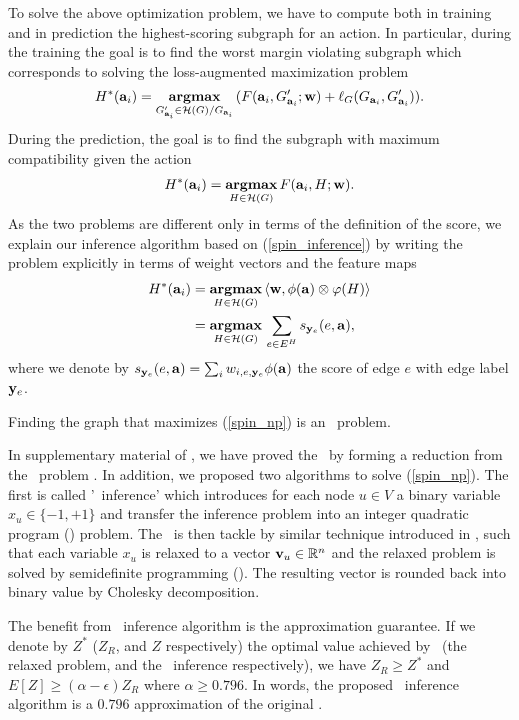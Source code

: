 {%
To solve the above optimization problem, we have to compute both in training and in prediction the highest-scoring subgraph for an action. 
In particular, during the training the goal is to find the worst margin violating subgraph which corresponds to solving the loss-augmented maximization problem
\begin{align*}
	H^*(\mathbf {a}_i) = \underset{G_{\mathbf {a}_i}'\in\mathcal{H}(G)/G_{\mathbf {a}_i}}{\textbf{argmax}}\, (F(\mathbf {a}_i,G_{\mathbf {a}_i}';\mathbf {w})+\mathbf {\ell}_{G}(G_{\mathbf {a}_i},G_{\mathbf {a}_i}')).
\end{align*}
During the prediction, the goal is to find the subgraph with maximum compatibility given the action
\begin{align}
	H^*(\mathbf {a}_i) = \underset{H\in\mathcal{H}(G)}{\textbf{argmax}}\, F(\mathbf {a}_i,H;\mathbf {w}) \label{spin_inference}.
\end{align}
As the two problems are different only in terms of the definition of the score, we explain our inference algorithm based on (\ref{spin_inference}) by writing the problem explicitly in terms of weight vectors and the feature maps
\begin{align}
	H^*(\mathbf {a}_i) &= \underset{H\in\mathcal{H}(G)}{\textbf{argmax}}\, \langle \mathbf {w}, \phi(\mathbf {a})\otimes\varphi(H) \rangle \nonumber \\
	&= \underset{H\in\mathcal{H}(G)}{\textbf{argmax}}\, \sum_{e\in E^H}s_{\mathbf {y}_e}(e,\mathbf {a}), \label{spin_np}
\end{align}
where we denote by $s_{\mathbf {y}_e}(e,\mathbf {a}) = \sum_{i}w_{i,e,\mathbf {y}_e}\phi(\mathbf {a})$ the score of edge $e$ with edge label $\mathbf {y}_e$.

\begin{lemma}
	Finding the graph that maximizes (\ref{spin_np}) is an \nphard\ problem.
\end{lemma}
In supplementary material of , we have proved the \nphardness\ by forming a reduction from the \maxcut\ problem \citep{Garey90computers}.
In addition, we proposed two algorithms to solve (\ref{spin_np}).
The first is called '{\sdp\ inference}' which introduces for each node $u\in V$ a binary variable $x_u\in\{-1,+1\}$ and transfer the inference problem into an integer quadratic program (\iqp) problem.
The \iqp\ is then tackle by similar technique introduced in \citep{Geomans1995improved}, such that each variable $x_u$ is relaxed to a vector $\mathbf {v}_u\in\mathbb{R}^n$ and the relaxed problem is solved by semidefinite programming (\sdp). 
The resulting vector is rounded back into binary value by Cholesky decomposition.

The benefit from \sdp\ inference algorithm is the approximation guarantee. 
If we denote by $Z^*$ ($Z_R$, and $Z$ respectively) the optimal value achieved by \iqp\ (the relaxed problem, and the \sdp\ inference respectively), we have $Z_R\ge Z^*$ and $E[Z]\ge(\alpha-\epsilon)Z_R$ where $\alpha\ge0.796$.
In words, the proposed \sdp\ inference algorithm is a $0.796$ approximation of the original \iqp.

}
